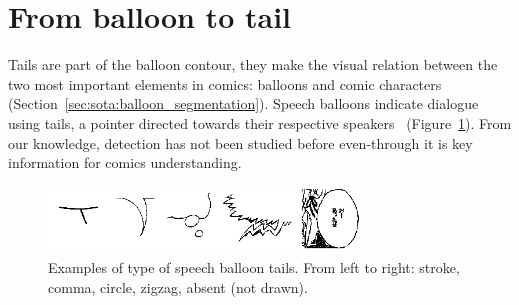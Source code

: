 

\section{From balloon to tail} %
\label{sec:se:from_balloon_to_tail}


Tails are part of the balloon contour, they make the visual relation between the two most important elements in comics: balloons and comic characters (Section~\ref{sec:sota:balloon_segmentation}).
Speech balloons indicate dialogue using tails, a pointer directed towards their respective speakers~\cite{Varnum2007Language} (Figure~\ref{fig:se:tail_types}).
From our knowledge, detection has not been studied before even-through it is key information for comics understanding.

    \begin{figure}[h]%
      \centering
      \includegraphics[trim= 0px 0px 0mm 0mm, clip, width=0.75\textwidth]{tail_types.png}
    \caption[Examples of type of speech balloon tails]{Examples of type of speech balloon tails. From left to right: stroke, comma, circle, zigzag, absent (not drawn).}
    \label{fig:se:tail_types}
    \end{figure}

